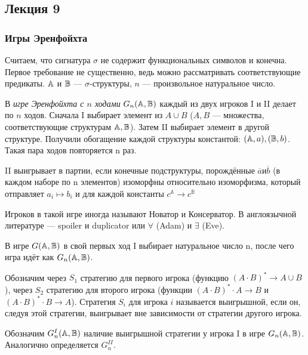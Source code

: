 \subsection{Лекция 9}

\subsubsection{Игры Эренфойхта}

Считаем, что сигнатура $\sigma$ не содержит функциональных символов и конечна. Первое требование не существенно, ведь можно рассматривать соответствующие предикаты. ${\mathbb A}$ и ${\mathbb B}$ — $\sigma$-структуры, $n$ — произвольное натуральное число.

\begin{definition}
    В \emph{игре Эренфойхта с $n$ ходами} $G_n({\mathbb A}, {\mathbb B})$ каждый из двух игроков I и II  делает по $n$ ходов. Сначала I выбирает элемент из $A\cup B$ ($A, B$ — множества, соответствующие структурам ${\mathbb A}, {\mathbb B}$). Затем II выбирает элемент в другой структуре. Получили обогащение каждой структуры константой: $({\mathbb A}, a), ({\mathbb B}, b)$. Такая пара ходов повторяется n раз.

    II выигрывает в партии, если конечные подструктуры, порождённые $\overline{a} и \overline{b}$ (в каждом наборе по n элементов) изоморфны относительно изоморфизма, который отправляет $a_i \mapsto b_i$ и для каждой константы $c^{\mathbb{A}}\to c^{\mathbb{B}}$
\end{definition}

\begin{remark}
    Игроков в такой игре иногда называют Новатор и Консерватор. В англоязычной литературе — spoiler и duplicator или $\forall$ (Adam) и $\exists$ (Eve).
\end{remark}

\begin{definition}
    В игре $G({\mathbb A}, {\mathbb B})$ в свой первых ход I выбирает натуральное число n, после чего игра идёт как $G_n({\mathbb A}, {\mathbb B})$.
\end{definition}

Обозначим через $S_1$ стратегию для первого игрока (функцию $(A\cdot B)^*\to A\cup B$), через $S_2$ стратегию для второго игрока (функции $(A\cdot B)^*\cdot A\to B$ и $(A\cdot B)^*\cdot B\to A$). Стратегия $S_i$ для игрока $i$ называется выигрышной, если он, следуя этой стратегии, выигрывает вне зависимости от стратегии другого игрока.

Обозначим $G_n^I({\mathbb A}, {\mathbb B})$ наличие выигрышной стратегии у игрока I в игре $G_n({\mathbb A}, {\mathbb B})$. Аналогично определяется $G_n^{II}$.

